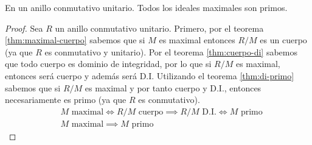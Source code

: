 \begin{cor}
    En un anillo conmutativo unitario. Todos los ideales maximales son primos.
\end{cor}

\begin{proof}
    Sea $R$ un anillo conmutativo unitario. Primero, por el teorema \ref{thm:maximal-cuerpo} sabemos que si $M$ es maximal entonces $R / M$ es un cuerpo (ya que $R$ es conmutativo y unitario). Por el teorema \ref{thm:cuerpo-di} sabemos que todo cuerpo es dominio de integridad, por lo que si $R / M$ es maximal, entonces será cuerpo y además será D.I. Utilizando el teorema \ref{thm:di-primo} sabemos que si $R / M$ es maximal y por tanto cuerpo y D.I., entonces necesariamente es primo (ya que $R$ es conmutativo).
    \begin{equation}
        \begin{split}
        & M \text{ maximal} \iff R / M \text{ cuerpo} \implies R / M \text{ D.I.} \iff M \text{ primo}\\
        & M \text{ maximal} \implies M \text{ primo}
        \end{split}
    \end{equation}
\end{proof}
